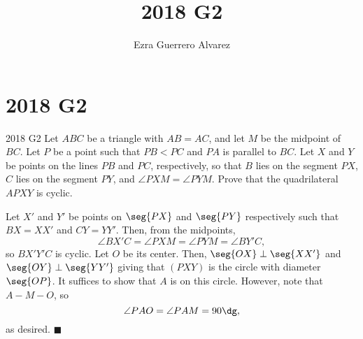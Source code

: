\documentclass[14pt]{article}
\title{2018 G2}
\author{Ezra Guerrero Alvarez}
\begin{document}
\maketitle
	
\section*{2018 G2}

\begin{statement}{2018 G2}
	Let $ABC$ be a triangle with $AB=AC$, and let $M$ be the midpoint of $BC$. Let $P$ be a point such that $PB<PC$ and $PA$ is parallel to $BC$. Let $X$ and $Y$ be points on the lines $PB$ and $PC$, respectively, so that $B$ lies on the segment $PX$, $C$ lies on the segment $PY$, and $\angle PXM=\angle PYM$. Prove that the quadrilateral $APXY$ is cyclic.
\end{statement}
Let $X'$ and $Y'$ be points on $\seg{PX}$ and $\seg{PY}$ respectively such that $BX=XX'$ and $CY=YY'$. Then, from the midpoints,
\[ \angle BX'C = \angle PXM = \angle PYM = \angle BY'C, \]
so $BX'Y'C$ is cyclic. Let $O$ be its center. Then, $\seg{OX}\perp\seg{XX'}$ and $\seg{OY}\perp\seg{YY'}$ giving that $(PXY)$ is the circle with diameter $\seg{OP}$. It suffices to show that $A$ is on this circle. However, note that $A-M-O$, so
\[ \angle PAO = \angle PAM = 90\dg, \]
as desired. $\blacksquare$
	
\end{document}
